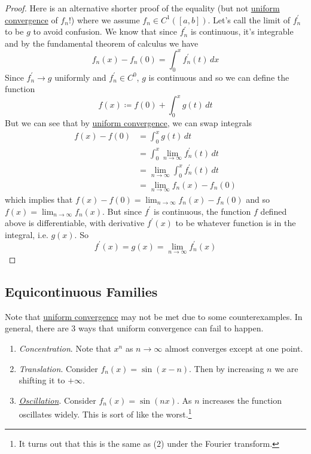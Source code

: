   \begin{proof}
    Here is an alternative shorter proof of the equality (but not \hyperref[def:uniform-convergence]{uniform convergence} of $f_n$!) where we assume $f_n \in C^1([a, b])$. 
    Let's call the limit of $f^\prime_n$ to be $g$ to avoid confusion. We know that since $f_n^\prime$ is continuous, it's integrable and by the fundamental theorem of calculus we have 
    \begin{equation}
      f_n (x) - f_n (0) = \int_0^x f_n^\prime (t) \,dx 
    \end{equation}
    Since $f_n^\prime \to g$ uniformly and $f_n^\prime \in C^0$, $g$ is continuous and so we can define the function
    \begin{equation}
      f(x) \coloneqq f(0) + \int_0^x g(t) \,dt
    \end{equation}
    But we can see that by \hyperref[def:uniform-convergence]{uniform convergence}, we can swap integrals  
    \begin{align}
      f(x) - f(0) & = \int_0^x g(t) \,dt \\ 
                  & = \int_0^x \lim_{n \to \infty} f_n^\prime (t) \,dt \\
                  & = \lim_{n \to \infty} \int_0^x f_n^\prime (t) \,dt \\ 
                  & = \lim_{n \to \infty} f_n (x) - f_n (0) 
    \end{align}
    which implies that $f(x) - f(0) = \lim_{n \to \infty} f_n (x) - f_n (0)$ and so $f(x) = \lim_{n \to \infty} f_n (x)$. But since $f^\prime$ is continuous, the function $f$ defined above is differentiable, with derivative $f^\prime (x)$ to be whatever function is in the integral, i.e. $g(x)$. So
    \begin{equation}
      f^\prime (x) = g(x) = \lim_{n \to \infty} f_n^\prime (x)
    \end{equation}
  \end{proof}

\subsection{Equicontinuous Families} 

  Note that \hyperref[def:uniform-convergence]{uniform convergence} may not be met due to some counterexamples. In general, there are 3 ways that uniform convergence can fail to happen. 

  \begin{enumerate}
    \item \textit{Concentration}. Note that $x^n$ as $n \to \infty$ almost converges except at one point. 
    \item \textit{Translation}. Consider $f_n (x) = \sin(x - n)$. Then by increasing $n$ we are shifting it to $+\infty$. 
    \item \textit{\hyperref[def:oscillation]{Oscillation}}. Consider $f_n (x) = \sin(nx)$. As $n$ increases the function oscillates widely. This is sort of like the worst.\footnote{It turns out that this is the same as (2) under the Fourier transform.} 
  \end{enumerate}

